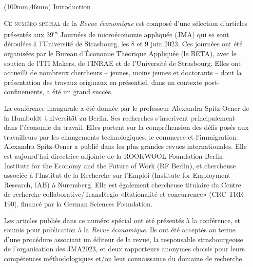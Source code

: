 \begin{Article}%
[Auteur={Thierry Kamionka\\ Sandrine Spaeter-Loehrer}, 
Titre={Avancées récentes\\ en microéconomie appliquée}]

\begin{textblock*}{50mm}(100mm,46mm) 
    \Large Introduction
\end{textblock*}

\label{intro}

\begin{refsection}[Intro]

\lettrine{C}{e numéro spécial} de la \emph{Revue économique} est composé d'une
sélection d'articles présentés aux 39\textsuperscript{es} Journées de
microéconomie appliquée (JMA) qui se sont déroulées à l'Université de
Strasbourg, les 8 et 9 juin 2023. Ces journées ont été organisées par le
Bureau d'Économie Théorique Appliquée (le BETA), avec le soutien de
l'ITI Makers, de l'INRAE et de l'Université de Strasbourg. Elles ont
accueilli de nombreux chercheurs -- jeunes, moins jeunes et doctorants -- dont
la présentation des travaux originaux en présentiel, dans un contexte post-confinements, a été un grand succès.

\medskip

La conférence inaugurale a été donnée par le professeur Alexandra
Spitz-Oener de la Humboldt Universität zu Berlin. Ses recherches s'inscrivent
principalement dans l'économie du travail. Elles portent sur la
compréhension des défis posés aux travailleurs par les changements
technologiques, le commerce et l'immigration. Alexandra
Spitz-Oener a publié dans les plus grandes revues internationales. Elle
est aujourd'hui directrice adjointe de la ROOKWOOL Foundation
Berlin Institute for the Economy and the Future of Work (RF Berlin), et
chercheuse associée à l'Institut de la Recherche sur
l'Emploi (Institute for Employment Research, IAB)
à Nuremberg. Elle est également chercheuse titulaire du Centre de
recherche collaborative/TransRegio «Rationalité et concurrence» (CRC
TRR 190), financé par la German Sciences Foundation.

\medskip

Les articles publiés dans ce numéro spécial ont été présentés à la
conférence, et soumis pour publication à la \emph{Revue économique}. Ils
ont été acceptés au terme d'une procédure associant un éditeur de la
revue, la responsable strasbourgeoise de l'organisation des JMA2023, et
deux rapporteurs anonymes choisis pour leurs compétences méthodologiques
et/ou leur connaissance du domaine de recherche.


\end{refsection}
\end{Article}

